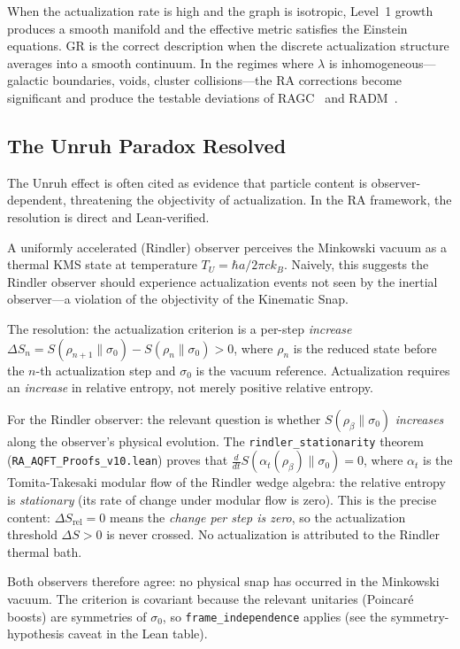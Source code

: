 \documentclass[11pt,a4paper]{article}
\theoremstyle{plain}
\theoremstyle{definition}
\theoremstyle{remark}
\begin{document}
When the actualization rate is high and the graph is isotropic, Level~1 growth
produces a smooth manifold and the effective metric satisfies the Einstein
equations. GR is the correct description when the discrete actualization
structure averages into a smooth continuum. In the regimes where $\lambda$ is
inhomogeneous---galactic boundaries, voids, cluster collisions---the RA
corrections become significant and produce the testable deviations of
RAGC~\citep{Sandeman2026b} and RADM~\citep{Sandeman2026RADM}.

\subsection{The Unruh Paradox Resolved}

The Unruh effect is often cited as evidence that particle content is
observer-dependent, threatening the objectivity of actualization. In the RA
framework, the resolution is direct and Lean-verified.

A uniformly accelerated (Rindler) observer perceives the Minkowski vacuum as
a thermal KMS state at temperature $T_U = \hbar a / 2\pi c k_B$. Naively,
this suggests the Rindler observer should experience actualization events not
seen by the inertial observer---a violation of the objectivity of the
Kinematic Snap.

The resolution: the actualization criterion is a per-step \emph{increase}
$\Delta S_n = S(\rho_{n+1}\|\sigma_0) - S(\rho_n\|\sigma_0) > 0$,
where $\rho_n$ is the reduced state before the $n$-th actualization step
and $\sigma_0$ is the vacuum reference. Actualization requires an
\emph{increase} in relative entropy, not merely positive relative entropy.

For the Rindler observer: the relevant question is whether $S(\rho_\beta\|\sigma_0)$
\emph{increases} along the observer's physical evolution. The
\texttt{rindler\_stationarity} theorem (\texttt{RA\_AQFT\_Proofs\_v10.lean})
proves that $\frac{d}{dt}S(\alpha_t(\rho_\beta)\|\sigma_0) = 0$, where
$\alpha_t$ is the Tomita-Takesaki modular flow of the Rindler wedge algebra:
the relative entropy is \emph{stationary} (its rate of change under modular
flow is zero). This is the precise content: $\Delta S_{\mathrm{rel}} = 0$
means the \emph{change per step is zero}, so the actualization threshold
$\Delta S > 0$ is never crossed. No actualization is attributed to the
Rindler thermal bath.

Both observers therefore agree: no physical snap has occurred in the Minkowski
vacuum. The criterion is covariant because the relevant unitaries (Poincar\'{e}
boosts) are symmetries of $\sigma_0$, so \texttt{frame\_independence} applies
(see the symmetry-hypothesis caveat in the Lean table).
\end{document}
